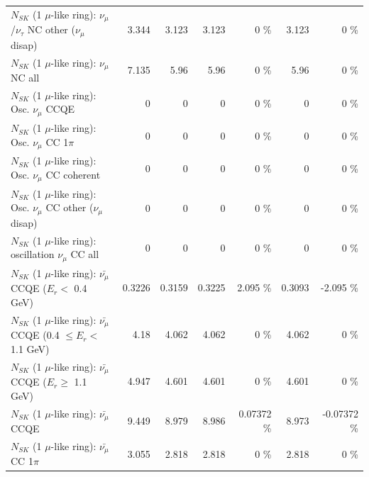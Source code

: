 \begin{table}
\begin{tabular}{| l | r | r | r  r | r  r |}
   $N_{SK}$ (1 $\mu$-like ring): $\nu_\mu$/$\nu_\tau$ NC other ($\nu_\mu$ disap) &           3.344 &           3.123 &           3.123 &        0 \%  &           3.123 &        0 \%  \\ 
                                $N_{SK}$ (1 $\mu$-like ring): $\nu_{\mu}$ NC all &           7.135 &            5.96 &            5.96 &        0 \%  &            5.96 &        0 \%  \\ 
\hline
\hline
                               $N_{SK}$ (1 $\mu$-like ring): Osc. $\nu_\mu$ CCQE &               0 &               0 &               0 &        0 \%  &               0 &        0 \%  \\ 
                          $N_{SK}$ (1 $\mu$-like ring): Osc. $\nu_\mu$ CC 1$\pi$ &               0 &               0 &               0 &        0 \%  &               0 &        0 \%  \\ 
                        $N_{SK}$ (1 $\mu$-like ring): Osc. $\nu_\mu$ CC coherent &               0 &               0 &               0 &        0 \%  &               0 &        0 \%  \\ 
         $N_{SK}$ (1 $\mu$-like ring): Osc. $\nu_\mu$ CC other ($\nu_\mu$ disap) &               0 &               0 &               0 &        0 \%  &               0 &        0 \%  \\ 
                      $N_{SK}$ (1 $\mu$-like ring): oscillation $\nu_\mu$ CC all &               0 &               0 &               0 &        0 \%  &               0 &        0 \%  \\ 
\hline
\hline
          $N_{SK}$ (1 $\mu$-like ring): $\bar{\nu_\mu}$ CCQE ($E_{r} <$ 0.4 GeV) &          0.3226 &          0.3159 &          0.3225 &    2.095 \%  &          0.3093 &   -2.095 \%  \\ 
 $N_{SK}$ (1 $\mu$-like ring): $\bar{\nu_\mu}$ CCQE (0.4 $\leq E_{r} <$ 1.1 GeV) &            4.18 &           4.062 &           4.062 &        0 \%  &           4.062 &        0 \%  \\ 
       $N_{SK}$ (1 $\mu$-like ring): $\bar{\nu_\mu}$ CCQE ($E_{r} \geq$ 1.1 GeV) &           4.947 &           4.601 &           4.601 &        0 \%  &           4.601 &        0 \%  \\ 
\hline
                              $N_{SK}$ (1 $\mu$-like ring): $\bar{\nu_\mu}$ CCQE &           9.449 &           8.979 &           8.986 &  0.07372 \%  &           8.973 & -0.07372 \%  \\ 
                         $N_{SK}$ (1 $\mu$-like ring): $\bar{\nu_\mu}$ CC 1$\pi$ &           3.055 &           2.818 &           2.818 &        0 \%  &           2.818 &        0 \%  \\ 

\end{tabular}
\end{table}
